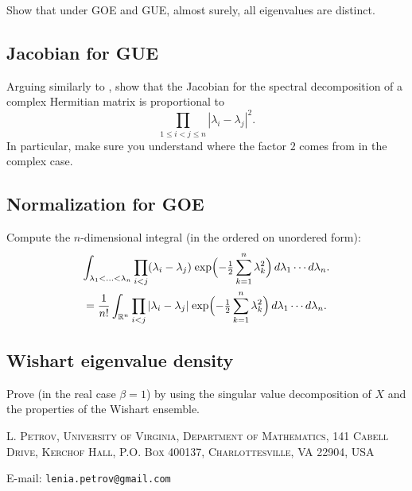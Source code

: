 \documentclass[letterpaper,11pt,oneside,reqno]{article}
\numberwithin{equation}{section}
\newcommand{\ssp}{\hspace{1pt}}
\theoremstyle{definition}
\begin{document}
Show that under GOE and GUE, almost surely,
all eigenvalues are distinct.

\subsection{Jacobian for GUE}
\label{prob:Jacobian-GUE}

Arguing similarly to 
,
show that the Jacobian for the spectral decomposition
of a complex Hermitian matrix is proportional to
\begin{equation*}
	\prod_{1\le i<j\le n}|\lambda_i-\lambda_j|^2.
\end{equation*}
In particular, make sure you understand 
where the factor $2$ comes from in the complex case.

\subsection{Normalization for GOE}
\label{prob:GOE-normalization}

Compute the $n$-dimensional integral
(in the ordered on unordered form):
\begin{multline*}
	\int_{\lambda_1<\ldots<\lambda_n } \prod_{i<j}(\lambda_i-\lambda_j)
	\ssp
	\exp\Bigl(-\tfrac{1}{2}\sum_{k=1}^n \lambda_k^2\Bigr)\,d\lambda_1\cdots d\lambda_n.\\=
	\frac{1}{n!}
	\int_{\mathbb{R}^n}
	\prod_{i<j}|\lambda_i-\lambda_j|\ssp
	\exp\Bigl(-\tfrac{1}{2}\sum_{k=1}^n \lambda_k^2\Bigr)\,d\lambda_1\cdots d\lambda_n.
\end{multline*}



\subsection{Wishart eigenvalue density}

Prove  (in the real case $\beta=1$)
by using the singular
value
decomposition
of \(X\) and the properties of the Wishart ensemble.






























\medskip

\textsc{L. Petrov, University of Virginia, Department of Mathematics, 141 Cabell Drive, Kerchof Hall, P.O. Box 400137, Charlottesville, VA 22904, USA}

E-mail: \texttt{lenia.petrov@gmail.com}
\end{document}
